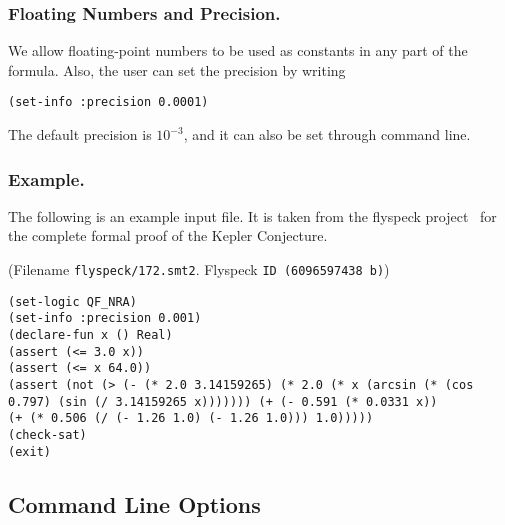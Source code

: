 \documentclass[envcountsect]{llncs}
\begin{document}
\subsubsection{Floating Numbers and Precision.} We allow floating-point numbers
to be used as constants in any part of the formula. Also, the user can set the
precision by writing
\begin{verbatim}
(set-info :precision 0.0001)
\end{verbatim}
The default precision is $10^{-3}$, and it can also be set through command
line.

\subsubsection{Example.}\label{example} The following is an example input file.
It is taken from the flyspeck project~\cite{} for the complete formal proof of
the Kepler Conjecture.
 \begin{example} (Filename {\tt flyspeck/172.smt2}. Flyspeck {\tt ID (6096597438
b)})
 \begin{verbatim}
(set-logic QF_NRA)
(set-info :precision 0.001)
(declare-fun x () Real)
(assert (<= 3.0 x))
(assert (<= x 64.0))
(assert (not (> (- (* 2.0 3.14159265) (* 2.0 (* x (arcsin (* (cos
0.797) (sin (/ 3.14159265 x))))))) (+ (- 0.591 (* 0.0331 x))
(+ (* 0.506 (/ (- 1.26 1.0) (- 1.26 1.0))) 1.0)))))
(check-sat)
(exit)
\end{verbatim}
\end{example}

\subsection{Command Line Options}
\end{document}
